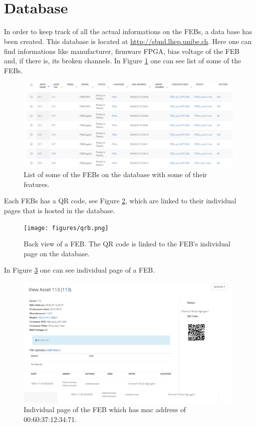 \documentclass[a4paper]{article}\linespread{1.4}
\begin{document}

\newpage
\appendix

\section{\\ Database} \label{App:AppendixA}

In order to keep track of all the actual informations on the FEBs, a data base has been created. This database is located at \url{http://sbnd.lhep.unibe.ch}.
Here one can find informations like manufacturer, firmware FPGA, bias voltage of the FEB and, if there is, its broken channels. In Figure \ref{fig:datab} one can see list of some of the FEBs.
\begin{figure}[h!] \hspace*{-1cm} \includegraphics[width=145mm,scale=2.0]{figures/datab.png} \caption{List of some of the FEBs on the database with some of their features.}  \label{fig:datab}\end{figure}
Each FEBs has a QR code, see Figure \ref{fig:qrb}, which are linked to their individual pages that is hosted in the database.
\begin{figure}[h!] \hspace*{-1cm} \texttt{[image: figures/qrb.png]} \caption{Back view of a FEB. The QR code is linked to the FEB's individual page on the database.}  \label{fig:qrb}\end{figure}
In Figure \ref{fig:databb} one can see individual page of a FEB.
\begin{figure}[h!] \hspace*{-1cm} \includegraphics[width=145mm,scale=2.0]{figures/databb.png} \caption{Individual page of the FEB which has mac address of 00:60:37:12:34:71.}  \label{fig:databb}\end{figure}
\end{document}
